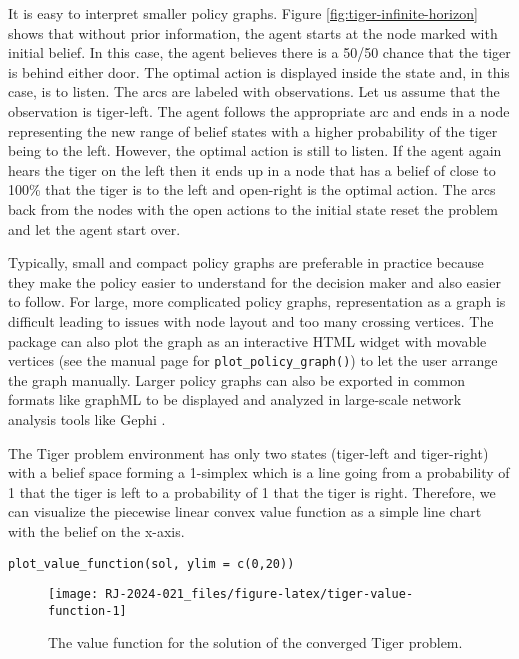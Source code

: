 It is easy to interpret smaller policy graphs. Figure \ref{fig:tiger-infinite-horizon} shows that without prior information,
the agent starts at the node marked with initial belief. In this case,
the agent believes there is a 50/50 chance that the tiger is behind
either door. The optimal action is displayed inside the state and, in this
case, is to listen. The arcs are labeled with observations. Let us
assume that the observation is tiger-left. The agent follows the
appropriate arc and ends in a node representing the new range of belief states with a higher probability of the tiger being to the left.
However, the optimal action is still to listen. If the agent again hears
the tiger on the left then it ends up in a node that has a
belief of close to 100\% that the tiger is to the left and open-right is the optimal
action. The arcs back from the nodes with the open actions to the
initial state reset the problem and let the agent start over.

Typically, small and compact policy graphs are preferable in practice because they make
the policy easier to understand for the decision maker and also easier to follow.
For large, more complicated policy graphs, representation as a graph is difficult
leading to issues with node layout and too many crossing vertices.
The package can also plot the
graph as an interactive HTML widget with movable vertices (see the manual page for \texttt{plot\_policy\_graph()})
to let the user arrange the graph manually.
Larger policy graphs can also be exported in common formats
like graphML to be displayed and analyzed in large-scale network analysis tools like Gephi \citep{Jacomy2014}.

The Tiger problem environment has only two states (tiger-left and tiger-right) with a
belief space forming a 1-simplex which is a line going from a probability of 1 that the tiger is left
to a probability of 1 that the tiger is right. Therefore, we can visualize the piecewise linear
convex value function as a simple line chart with the belief on the x-axis.

\begin{verbatim}
plot_value_function(sol, ylim = c(0,20))
\end{verbatim}

\begin{figure}
\texttt{[image: RJ-2024-021\_files/figure-latex/tiger-value-function-1]} \caption{The value function for the solution of the converged Tiger problem.}\label{fig:tiger-value-function}
\end{figure}


